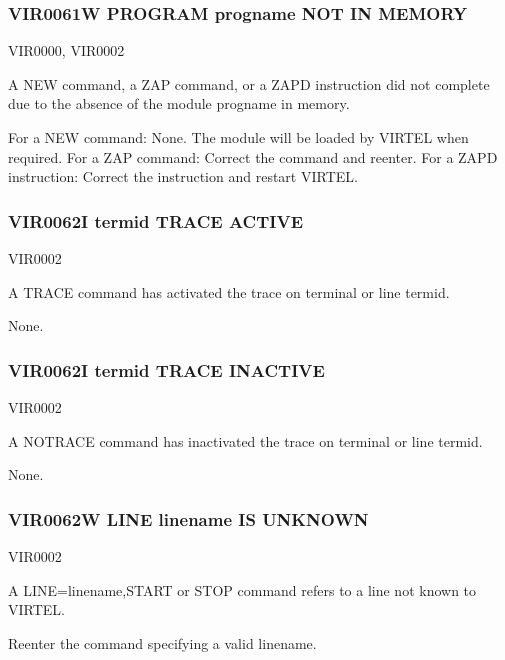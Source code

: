 \documentclass[letterpaper,10pt,english]{sphinxmanual}
\begin{document}
\subsubsection{VIR0061W PROGRAM progname NOT IN MEMORY}
\label{\detokenize{messages:vir0061w-program-progname-not-in-memory}}\begin{description}
\sphinxAtStartPar
VIR0000, VIR0002

\sphinxAtStartPar
A NEW command, a ZAP command, or a ZAPD instruction did not complete due to the absence of the module progname in memory.

\sphinxAtStartPar
For a NEW command: None. The module will be loaded by VIRTEL when required. For a ZAP command: Correct the command and reenter. For a ZAPD instruction: Correct the instruction and restart VIRTEL.

\end{description}


\subsubsection{VIR0062I termid TRACE ACTIVE}
\label{\detokenize{messages:vir0062i-termid-trace-active}}\begin{description}
\sphinxAtStartPar
VIR0002

\sphinxAtStartPar
A TRACE command has activated the trace on terminal or line termid.

\sphinxAtStartPar
None.

\end{description}


\subsubsection{VIR0062I termid TRACE INACTIVE}
\label{\detokenize{messages:vir0062i-termid-trace-inactive}}\begin{description}
\sphinxAtStartPar
VIR0002

\sphinxAtStartPar
A NOTRACE command has inactivated the trace on terminal or line termid.

\sphinxAtStartPar
None.

\end{description}


\subsubsection{VIR0062W LINE linename IS UNKNOWN}
\label{\detokenize{messages:vir0062w-line-linename-is-unknown}}\begin{description}
\sphinxAtStartPar
VIR0002

\sphinxAtStartPar
A LINE=linename,START or STOP command refers to a line not known to VIRTEL.

\sphinxAtStartPar
Reenter the command specifying a valid linename.

\end{description}
\end{document}
